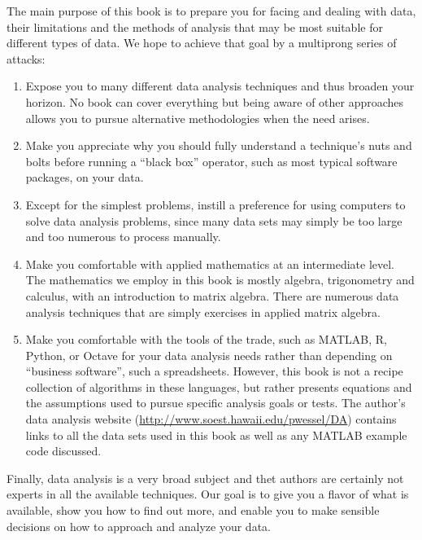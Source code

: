 The main purpose of this book is to prepare you for facing and dealing with data, their limitations and
the methods of analysis that may be most suitable for different types of data.  We hope to achieve that goal by
a multiprong series of attacks:

\begin{enumerate}
\item Expose you to many different data analysis techniques and thus broaden your horizon. No book can cover
   everything but being aware of other approaches allows you to pursue alternative
methodologies when the need arises.
\item Make you appreciate why you should fully understand a technique's nuts and bolts before running a ``black
   box'' operator, such as most typical software packages, on your data.
\item Except for the simplest problems, instill a preference for using computers to solve data
   analysis problems, since many data sets may simply be too large and too numerous to process manually.
\item Make you comfortable with applied mathematics at an intermediate level.  The mathematics we employ
   in this book is mostly algebra, trigonometry and calculus, with an introduction to matrix algebra.
   There are numerous data analysis techniques that are simply exercises in applied matrix algebra.
\item Make you comfortable with the tools of the trade, such as MATLAB, R, Python, or Octave for your data analysis needs
   rather than depending on ``business software'', such a spreadsheets.
   However, this book is not a recipe collection of algorithms in these languages, but rather presents equations and the
   assumptions used to pursue specific analysis goals or tests.  The author's data analysis website
   (\url{http://www.soest.hawaii.edu/pwessel/DA}) contains links to all the
   data sets used in this book as well as any MATLAB example code discussed.
\end{enumerate}

Finally, data analysis is a very broad subject and thet authors are certainly not experts in all the available
techniques. Our goal is to give you a flavor
of what is available, show you how to find out more, and enable you to make sensible decisions on how
to approach and analyze your data.

